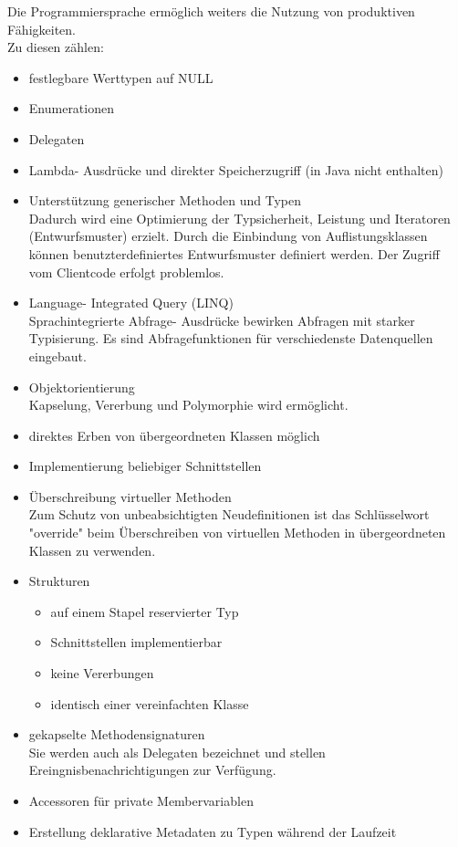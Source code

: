 \documentclass[12pt,a4paper]{report}
\begin{document}
\begin{onehalfspace}
Die Programmiersprache ermöglich weiters die Nutzung von produktiven Fähigkeiten.
\\Zu diesen zählen:
\begin{itemize}
\item festlegbare Werttypen auf NULL
\item Enumerationen
\item Delegaten
\item Lambda- Ausdrücke und direkter Speicherzugriff (in Java nicht enthalten)
\item Unterstützung generischer Methoden und Typen\\
Dadurch wird eine Optimierung der Typsicherheit, Leistung und Iteratoren (Entwurfsmuster) erzielt. Durch die Einbindung von Auflistungsklassen können benutzterdefiniertes Entwurfsmuster definiert werden. Der Zugriff vom Clientcode erfolgt problemlos.
\item Language- Integrated Query (LINQ)\\
Sprachintegrierte Abfrage- Ausdrücke bewirken Abfragen mit starker Typisierung. Es sind Abfragefunktionen für verschiedenste Datenquellen eingebaut.
\item Objektorientierung\\
Kapselung, Vererbung und Polymorphie wird ermöglicht.
\item direktes Erben von übergeordneten Klassen möglich
\item Implementierung beliebiger Schnittstellen
\item Überschreibung virtueller Methoden\\
Zum Schutz von unbeabsichtigten Neudefinitionen ist das Schlüsselwort "{}override"{} beim Überschreiben von virtuellen Methoden in übergeordneten Klassen zu verwenden.
\item  Strukturen
\begin{itemize}
\item auf einem Stapel reservierter Typ
\item Schnittstellen implementierbar
\item keine Vererbungen
\item identisch einer vereinfachten Klasse
\end{itemize}
\item gekapselte Methodensignaturen\\
Sie werden auch als Delegaten bezeichnet und stellen Ereingnisbenachrichtigungen zur Verfügung.
\item Accessoren für private Membervariablen
\item Erstellung deklarative Metadaten zu Typen während der Laufzeit

\end{itemize}
\end{onehalfspace}
\end{document}
